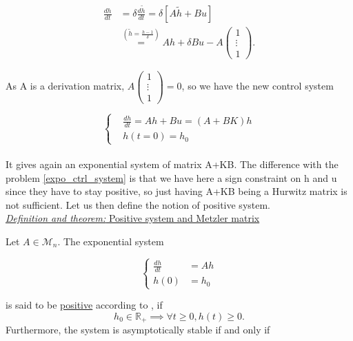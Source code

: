 \documentclass[12pt]{article}
\begin{document}
\begin{align}
    \frac{dh}{dt} &= \delta\frac{d\tilde{h}}{dt} = \delta \left[ A\tilde{h} + Bu\right] \\
    &\stackrel{(\tilde{h}=\frac{h-1}{\delta})}{=} Ah + \delta Bu - A \begin{pmatrix}
        1 \\ \vdots \\ 1
    \end{pmatrix} .
\end{align}

As A is a derivation matrix, 
$A \begin{pmatrix}
        1 \\ \vdots \\ 1
\end{pmatrix} =0$, so we have the new control system

\begin{equation}\label{pos_ctrl_system}
\left\{
\begin{aligned}
    &\frac{dh}{dt} = Ah+Bu = (A+BK)h\\
    &h(t=0) = h_0
\end{aligned}
\right. 
\end{equation}
\\

It gives again an exponential system of matrix A+KB. The difference with the problem \eqref{expo_ctrl_system} is that we have here a sign constraint on h and u since they have to stay positive, so just having A+KB being a Hurwitz matrix is not sufficient. Let us then define the notion of positive system.
\\

\underline{\textit{Definition and theorem:} Positive system and Metzler matrix}

Let $A \in \mathcal{M}_n.$ The exponential system 

\begin{equation}
\left\{
\begin{aligned}
\frac{dh}{dt}&= Ah\\
h(0) &= h_0 
\end{aligned}
\right.
\end{equation}

is said to be \underline{positive} according to \cite{pos_ctrl_paper}, if 
\begin{equation}
    h_0 \in \mathbb{R}_+ \implies \forall t \geq 0, h(t) \geq 0.
\end{equation}
Furthermore, the system is asymptotically stable if and only if 
\end{document}
